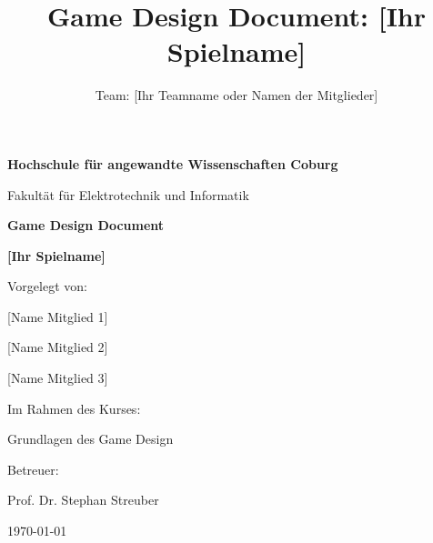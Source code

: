 \documentclass[11pt, a4paper]{article} %
\title{Game Design Document: [Ihr Spielname]} %
\author{Team: [Ihr Teamname oder Namen der Mitglieder]} %
\begin{document}
\begin{titlepage}
    \centering %
    \vspace*{1cm} %

    {\Large \textbf{Hochschule für angewandte Wissenschaften Coburg}}\par
    \vspace{0.5cm} %
    {\large Fakultät für Elektrotechnik und Informatik}\par
    \vspace{2.5cm} %

    {\huge \bfseries Game Design Document}\par
    \vspace{1cm} %

    {\HUGE \bfseries [Ihr Spielname]}\par
    \vspace{3cm} %

    {\Large Vorgelegt von:}\par
    \vspace{0.5cm}
    {\large [Name Mitglied 1]}\par %
    {\large [Name Mitglied 2]}\par
    {\large [Name Mitglied 3]}\par
    \vspace{1.5cm}

    {\Large Im Rahmen des Kurses:}\par
    \vspace{0.3cm}
    {\large Grundlagen des Game Design}\par %
    \vspace{0.5cm}
    {\Large Betreuer:}\par
    \vspace{0.3cm}
    {\large Prof. Dr. Stephan Streuber}\par

    \vfill

    {\large \today}\par %

\end{titlepage}
\end{document}
